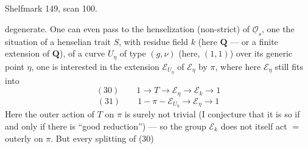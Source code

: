 Shelfmark 149, scan 100.

degenerate. One can even pass to the henselization (non-strict) of $\underline{\mathcal O}_s$, one  the situation of a henselian trait $S$, with residue field $k$ (here $\mathbf Q$ --- or a finite extension of $\mathbf Q$), of a curve $U_\eta$ of type $(g,\nu)$ (here, $(1,1)$) over its generic point $\eta$, one is interested in the extension $\mathcal E_{U_\eta}$ of $\mathcal E_\eta$ by $\pi$, where here $\mathcal E_\eta$ still fits into
\[
(30)\qquad 1\longrightarrow T\longrightarrow\mathcal E_\eta\longrightarrow\mathcal E_k\longrightarrow1
\]
 
\[
(31)\qquad 1-\pi-\mathcal E_{U_\eta}\longrightarrow\mathcal E_\eta\longrightarrow1
\]
Here the outer action of $T$ on $\pi$ is surely not trivial (I conjecture that it is so if and only if there is ``good reduction'') --- so the group $\mathcal E_k$ does not itself act $=$ outerly on $\pi$. But every splitting of (30)
